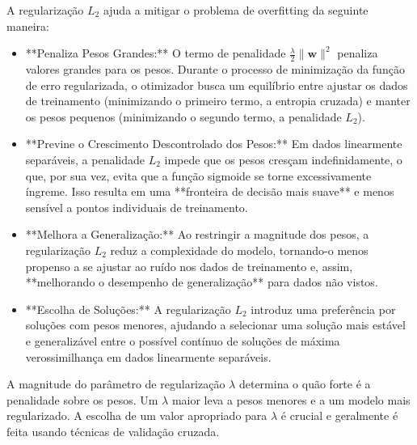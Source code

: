 \documentclass{article}
\begin{document}
A regularização $L_2$ ajuda a mitigar o problema de overfitting da seguinte maneira:
\begin{itemize}
    \item **Penaliza Pesos Grandes:** O termo de penalidade $\frac{\lambda}{2} \|\mathbf{w}\|^2$ penaliza valores grandes para os pesos. Durante o processo de minimização da função de erro regularizada, o otimizador busca um equilíbrio entre ajustar os dados de treinamento (minimizando o primeiro termo, a entropia cruzada) e manter os pesos pequenos (minimizando o segundo termo, a penalidade $L_2$).
    \item **Previne o Crescimento Descontrolado dos Pesos:** Em dados linearmente separáveis, a penalidade $L_2$ impede que os pesos cresçam indefinidamente, o que, por sua vez, evita que a função sigmoide se torne excessivamente íngreme. Isso resulta em uma **fronteira de decisão mais suave** e menos sensível a pontos individuais de treinamento.
    \item **Melhora a Generalização:** Ao restringir a magnitude dos pesos, a regularização $L_2$ reduz a complexidade do modelo, tornando-o menos propenso a se ajustar ao ruído nos dados de treinamento e, assim, **melhorando o desempenho de generalização** para dados não vistos.
    \item **Escolha de Soluções:** A regularização $L_2$ introduz uma preferência por soluções com pesos menores, ajudando a selecionar uma solução mais estável e generalizável entre o possível contínuo de soluções de máxima verossimilhança em dados linearmente separáveis.
\end{itemize}
A magnitude do parâmetro de regularização $\lambda$ determina o quão forte é a penalidade sobre os pesos. Um $\lambda$ maior leva a pesos menores e a um modelo mais regularizado. A escolha de um valor apropriado para $\lambda$ é crucial e geralmente é feita usando técnicas de validação cruzada.
\end{document}
